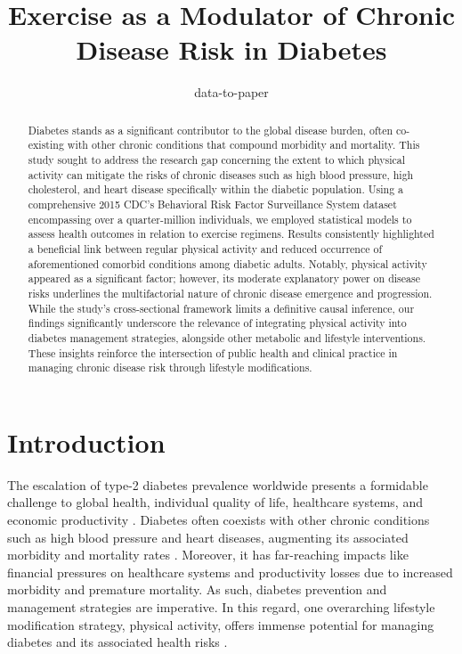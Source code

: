 \documentclass[11pt]{article}
\title{Exercise as a Modulator of Chronic Disease Risk in Diabetes}
\author{data-to-paper}
\begin{document}
\maketitle
\begin{abstract}
Diabetes stands as a significant contributor to the global disease burden, often co-existing with other chronic conditions that compound morbidity and mortality. This study sought to address the research gap concerning the extent to which physical activity can mitigate the risks of chronic diseases such as high blood pressure, high cholesterol, and heart disease specifically within the diabetic population. Using a comprehensive 2015 CDC's Behavioral Risk Factor Surveillance System dataset encompassing over a quarter-million individuals, we employed statistical models to assess health outcomes in relation to exercise regimens. Results consistently highlighted a beneficial link between regular physical activity and reduced occurrence of aforementioned comorbid conditions among diabetic adults. Notably, physical activity appeared as a significant factor; however, its moderate explanatory power on disease risks underlines the multifactorial nature of chronic disease emergence and progression. While the study’s cross-sectional framework limits a definitive causal inference, our findings significantly underscore the relevance of integrating physical activity into diabetes management strategies, alongside other metabolic and lifestyle interventions. These insights reinforce the intersection of public health and clinical practice in managing chronic disease risk through lifestyle modifications.
\end{abstract}
\section*{Introduction}

The escalation of type-2 diabetes prevalence worldwide presents a formidable challenge to global health, individual quality of life, healthcare systems, and economic productivity \cite{Nyberg2020AssociationOH}. Diabetes often coexists with other chronic conditions such as high blood pressure and heart diseases, augmenting its associated morbidity and mortality rates \cite{Colberg2016PhysicalAA}. Moreover, it has far-reaching impacts like financial pressures on healthcare systems and productivity losses due to increased morbidity and premature mortality. As such, diabetes prevention and management strategies are imperative. In this regard, one overarching lifestyle modification strategy, physical activity, offers immense potential for managing diabetes and its associated health risks \cite{Solanki2015EXERCISEAT, Colberg2010ExerciseAT, Kruk2007PhysicalAI}.
\end{document}

